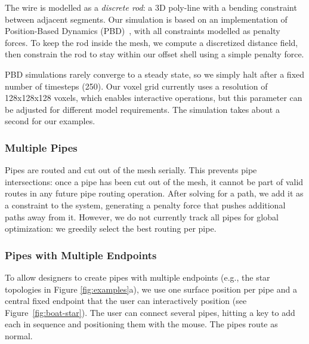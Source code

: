 The wire is modelled as a \emph{discrete rod}: a 3D poly-line with a bending 
constraint between adjacent segments. Our simulation is based on an
implementation of Position-Based Dynamics (PBD)~\cite{Muller07}, with all constraints
modelled as penalty forces. To keep the rod inside the
mesh, we compute a discretized distance field, then constrain the
rod to stay within our offset shell using a simple penalty force.


PBD simulations rarely converge to a steady state, so we simply halt after a fixed number of timesteps (250). Our voxel grid currently uses a resolution of 128x128x128 voxels, which enables interactive operations, but this parameter can be adjusted for different model requirements. The simulation takes about a second for our examples.

\subsubsection{Multiple Pipes}
Pipes are routed and cut out of the mesh serially. This prevents pipe intersections: once a pipe has been cut out of the mesh, it cannot be part of valid routes in any future pipe routing operation. After solving for a path, we add it as a constraint to the system, generating
a penalty force that pushes additional paths away from it.  However, we do not currently track all pipes for global optimization: we greedily select the best routing per pipe. 

\subsubsection{Pipes with Multiple Endpoints}
To allow designers to create pipes with multiple endpoints (e.g., the star topologies in Figure \ref{fig:examples}a), we use one surface position per pipe and a central fixed endpoint that the user can interactively position (see Figure~\ref{fig:boat-star}).  The user can connect several pipes, hitting a key to add each in sequence and positioning them with the mouse.  The pipes route as normal.

